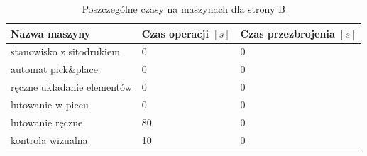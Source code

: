 \begin{table}[H]
	\centering
	\caption{Poszczególne czasy na maszynach dla strony B}
	\begin{tabular}{lll}
		\toprule
		Nazwa maszyny                 & Czas operacji $[s]$ & Czas przezbrojenia $[s]$ \\
		\midrule
		stanowisko z sitodrukiem      & 0                   & 0                        \\
		automat pick\&place           & 0                   & 0                        \\
		ręczne układanie elementów & 0                   & 0                        \\
		lutowanie w piecu             & 0                   & 0                        \\
		lutowanie ręczne             & 80                  & 0                        \\
		kontrola wizualna             & 10                  & 0                        \\
		\bottomrule
	\end{tabular}
\end{table}



